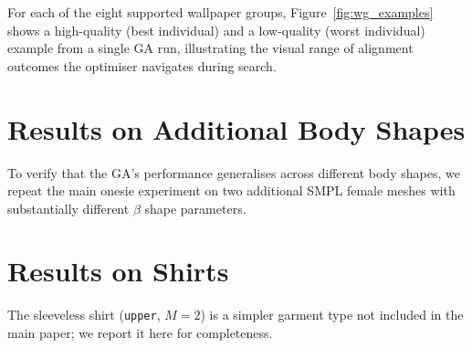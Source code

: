 \documentclass[runningheads]{llncs}
\begin{document}
For each of the eight supported wallpaper groups, Figure~\ref{fig:wg_examples}
shows a high-quality (best individual) and a low-quality (worst
individual) example from a single GA run, illustrating the visual
range of alignment outcomes the optimiser navigates during search.


\section{Results on Additional Body Shapes}
\label{sup:body_shapes}

To verify that the GA's performance generalises across different body
shapes, we repeat the main onesie experiment on two additional SMPL
female meshes with substantially different $\beta$ shape parameters.


\section{Results on Shirts}
\label{sup:shirts}

The sleeveless shirt (\texttt{upper}, $M=2$) is a simpler garment
type not included in the main paper; we report it here for
completeness.

\end{document}
